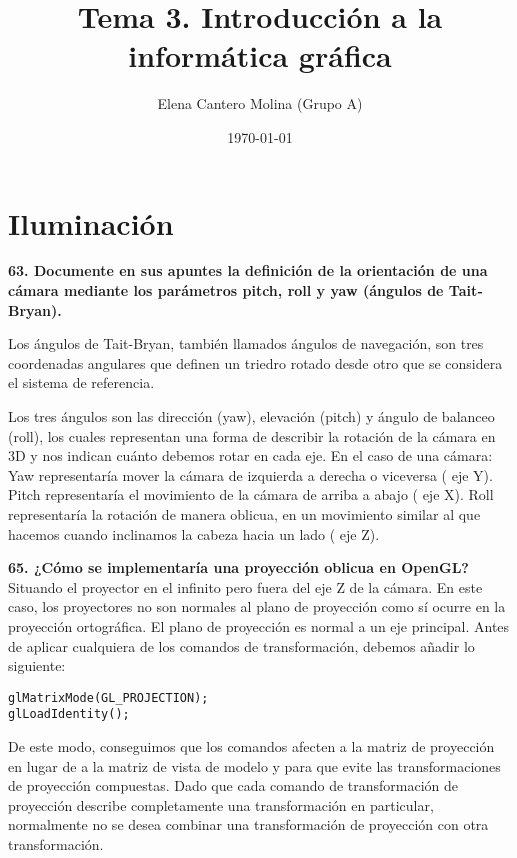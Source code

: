 \documentclass[a4paper, 11pt]{article}
\title{\textbf{Tema 3.}\textbf{ Introducción a la informática gráfica}}
\author{Elena Cantero Molina (Grupo A)}
\date{\today}
\begin{document}
\maketitle


\setlength{\parskip}{5pt}

\section{Iluminación}

\textbf{63. Documente en sus apuntes la definición de la orientación de una cámara mediante los parámetros pitch, roll y yaw (ángulos de Tait‐Bryan).}

Los ángulos de Tait-Bryan, también llamados ángulos de navegación, son tres coordenadas angulares que definen un triedro rotado desde otro que se considera el sistema de referencia.

Los tres ángulos son las dirección (yaw), elevación (pitch) y ángulo de balanceo (roll), los cuales representan una forma de describir la rotación de la cámara en 3D y nos indican cuánto debemos rotar en cada eje. En el caso de una cámara:
 Yaw representaría mover la cámara de izquierda a derecha o viceversa ( eje Y).
Pitch representaría el movimiento de la cámara de arriba a abajo ( eje X).
Roll representaría la rotación de manera oblicua, en un movimiento similar al que hacemos cuando inclinamos la cabeza hacia un lado ( eje Z).

\textbf{65. ¿Cómo se implementaría una proyección oblicua en OpenGL?}
Situando el proyector en el infinito pero fuera del eje Z de la cámara. En este caso, los proyectores no son normales al plano de proyección como sí ocurre en la proyección ortográfica. El plano de proyección es normal a un eje principal. Antes de aplicar cualquiera de los comandos de transformación, debemos añadir lo siguiente:

\begin{lstlisting}
glMatrixMode(GL_PROJECTION);
glLoadIdentity();
\end{lstlisting}

De este modo, conseguimos que los comandos afecten a la matriz de proyección en lugar de a la matriz de vista de modelo y para que evite las transformaciones de proyección compuestas. Dado que cada comando de transformación de proyección describe completamente una transformación en particular, normalmente no se desea combinar una transformación de proyección con otra transformación.
\end{document}
